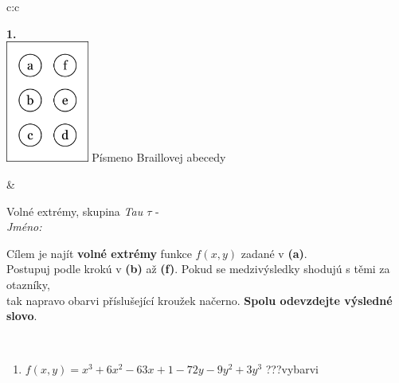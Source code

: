 \documentclass[10pt]{report}
\begin{document}
\begin{tabular}{c:c}
\begin{minipage}[c][104.5mm][t]{0.5\linewidth}
\begin{center}
\begin{minipage}{0.79\linewidth}
\begin{center}
\begin{varwidth}{\linewidth}
\begin{enumerate}
\end{enumerate}
\end{varwidth}
\end{center}
\end{minipage}
\begin{minipage}{0.20\linewidth}
\begin{center}
{\Huge\bfseries 1.} \\[2mm]
\includegraphics[height=40mm]{../images/braille.png}
{\small Písmeno Braillovej abecedy}
\end{center}
\end{minipage}
\end{center}
\end{minipage}
&
\begin{minipage}[c][104.5mm][t]{0.5\linewidth}
\begin{center}
\vspace{7mm}
{\huge Volné extrémy, skupina \textit{Tau $\tau$} -}\\[5mm]
\textit{Jméno:}\phantom{xxxxxxxxxxxxxxxxxxxxxxxxxxxxxxxxxxxxxxxxxxxxxxxxxxxxxxxxxxxxxxxxx}\\[5mm]
\begin{minipage}{0.95\linewidth}
\begin{center}
Cílem je najít \textbf{volné extrémy} funkce $f(x,y)$ zadané v \textbf{(a)}.\\Postupuj podle krokú v \textbf{(b)} až \textbf{(f)}. Pokud se medzivýsledky shodujú s těmi za otazníky,\\tak napravo obarvi příslušející kroužek načerno. \textbf{Spolu odevzdejte výsledné slovo}.
\end{center}
\end{minipage}
\\[1mm]
\begin{minipage}{0.79\linewidth}
\begin{center}
\begin{varwidth}{\linewidth}
\begin{enumerate}
\normalsize
\item $f(x,y)=x^3+6x^2-63x+1-72y-9y^2+3y^3$\quad \dotfill\; ???\;\dotfill \quad vybarvi

\end{enumerate}
\end{varwidth}
\end{center}
\end{minipage}
\end{center}
\end{minipage}
\end{tabular}
\end{document}
